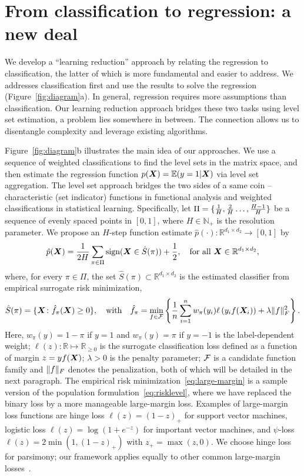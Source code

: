 \documentclass[11pt]{article}
\theoremstyle{definition}
\def\sign{\textup{sign}}
\begin{document}
\section{From classification to regression: a new deal}\label{sec:idea}
We develop a ``learning reduction'' approach by relating the regression to classification, the latter of which is more fundamental and easier to address. We addresses classification first and use the results to solve the regression (Figure~\ref{fig:diagram}a). In general, regression requires more assumptions than classification. Our learning reduction approach bridges these two tasks using level set estimation, a problem lies somewhere in between. The connection allows us to disentangle complexity and leverage existing algorithms. 

Figure~\ref{fig:diagram}b illustrates the main idea of our approaches. We use a sequence of weighted classifications to find the level sets in the matrix space, and then estimate the regression function $p(\bm X)=\mathbb{E}(y=1|\bm X)$ via level set aggregation. The level set approach bridges the two sides of a same coin -- characteristic (set indicator) functions in functional analysis and weighted classifications in statistical learning. Specifically, let $\Pi=\{{1\over H},{2\over H} \ldots, {H-1\over H} \}$ be a sequence of evenly spaced points in $[0,1]$, where $H\in\mathbb{N}_{+}$ is the resolution parameter. We propose an $H$-step function estimate $\hat p(\cdot)\colon \mathbb{R}^{d_1\times d_2} \to [0,1]$ by
\begin{equation}\label{eq:stepfunction}
\hat p(\mX)= {1\over 2H}  \sum_{\pi \in \Pi} \sign (\mX\in \hat S(\pi))+{1\over 2},\quad \text{for all }\mX\in\mathbb{R}^{d_1\times d_2},
\end{equation}
where, for every $\pi\in\Pi$, the set $\hat S(\pi)\subset \mathbb{R}^{d_1\times d_2}$ is the estimated classifier from empirical surrogate risk minimization,
\begin{align}\label{eq:large-margin}
\hat S(\pi) = \{\bm X \colon \hat f_\pi(\bm X) \geq 0\}, \quad \text{with}\quad \hat f_\pi=\min_{f\in\mathcal{F}}\left\{ {1\over n}\sum_{i=1}^n w_{\pi}(y_i)\ell\left(y_if(\bm X_i)\right)+ \lambda \lVert f\rVert_F^2\right\}.
\end{align}
Here, $w_\pi(y) = 1-\pi $ if $y = 1$ and $w_\pi(y)=\pi$ if $y = -1$ is the label-dependent weight; $\ell(z)\colon \mathbb{R}\mapsto \mathbb{R}_{\geq 0}$ is the surrogate classification loss defined as a function of margin $z=yf(\bm X)$; $\lambda>0$ is the penalty parameter; $\mathcal{F}$ is a candidate function family and $\lVert f\rVert_F$ denotes the penalization, both of which will be detailed in the next paragraph. The empirical risk minimization~\eqref{eq:large-margin} is a sample version of the population formulation~\eqref{eq:risklevel}, where we have replaced the binary loss by a more manageable large-margin loss. Examples of large-margin loss functions are hinge loss $\ell(z) = (1-z)_+$ for support vector machines, logistic loss $\ell(z) =\log(1+e^{-z})$ for important vector machines, and $\psi$-loss $\ell(z)=2\min(1,(1-z)_+)$ with $z_{+}=\max(z,0)$. We choose hinge loss for parsimony; our framework applies equally to other common large-margin losses~\citep{bartlett2006convexity}. 
\end{document}
